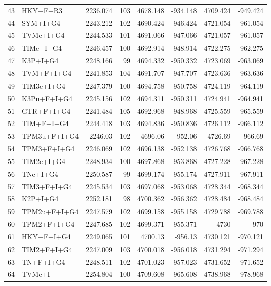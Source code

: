 \documentclass[12pt]{article}
\begin{document}
\begin{longtable}{clrrrrrr}
	43 & HKY+F+R3 & 2236.074 & 103 & 4678.148 & -934.148 & 4709.424 & -949.424 \\ 
	44 & SYM+I+G4 & 2243.212 & 102 & 4690.424 & -946.424 & 4721.054 & -961.054 \\ 
	45 & TVMe+I+G4 & 2244.533 & 101 & 4691.066 & -947.066 & 4721.057 & -961.057 \\ 
	46 & TIMe+I+G4 & 2246.457 & 100 & 4692.914 & -948.914 & 4722.275 & -962.275 \\ 
	47 & K3P+I+G4 & 2248.166 & 99 & 4694.332 & -950.332 & 4723.069 & -963.069 \\ 
	48 & TVM+F+I+G4 & 2241.853 & 104 & 4691.707 & -947.707 & 4723.636 & -963.636 \\ 
	49 & TIM3e+I+G4 & 2247.379 & 100 & 4694.758 & -950.758 & 4724.119 & -964.119 \\ 
	50 & K3Pu+F+I+G4 & 2245.156 & 102 & 4694.311 & -950.311 & 4724.941 & -964.941 \\ 
	51 & GTR+F+I+G4 & 2241.484 & 105 & 4692.968 & -948.968 & 4725.559 & -965.559 \\ 
	52 & TIM+F+I+G4 & 2244.418 & 103 & 4694.836 & -950.836 & 4726.112 & -966.112 \\ 
	53 & TPM3u+F+I+G4 & 2246.03 & 102 & 4696.06 & -952.06 & 4726.69 & -966.69 \\ 
	54 & TPM3+F+I+G4 & 2246.069 & 102 & 4696.138 & -952.138 & 4726.768 & -966.768 \\ 
	55 & TIM2e+I+G4 & 2248.934 & 100 & 4697.868 & -953.868 & 4727.228 & -967.228 \\ 
	56 & TNe+I+G4 & 2250.587 & 99 & 4699.174 & -955.174 & 4727.911 & -967.911 \\ 
	57 & TIM3+F+I+G4 & 2245.534 & 103 & 4697.068 & -953.068 & 4728.344 & -968.344 \\ 
	58 & K2P+I+G4 & 2252.181 & 98 & 4700.362 & -956.362 & 4728.484 & -968.484 \\ 
	59 & TPM2u+F+I+G4 & 2247.579 & 102 & 4699.158 & -955.158 & 4729.788 & -969.788 \\ 
	60 & TPM2+F+I+G4 & 2247.685 & 102 & 4699.371 & -955.371 & 4730 & -970 \\ 
	61 & HKY+F+I+G4 & 2249.065 & 101 & 4700.13 & -956.13 & 4730.121 & -970.121 \\ 
	62 & TIM2+F+I+G4 & 2247.009 & 103 & 4700.018 & -956.018 & 4731.294 & -971.294 \\ 
	63 & TN+F+I+G4 & 2248.511 & 102 & 4701.023 & -957.023 & 4731.652 & -971.652 \\ 
	64 & TVMe+I & 2254.804 & 100 & 4709.608 & -965.608 & 4738.968 & -978.968 \\ 

\end{longtable}
\end{document}
